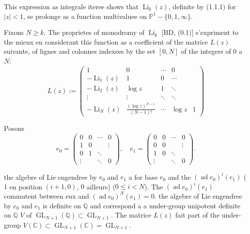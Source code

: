 \documentclass[12pt,a4paper]{article}
\theoremstyle{plain}
\theoremstyle{definition}
\theoremstyle{remark}
\DeclareMathOperator{\ad}{ad}
\newcommand{\Q}{\mathbb{Q}}
\newcommand{\C}{\mathbb{C}}
\newcommand{\IP}{\mathbb{P}}
\begin{document}
This expression as int{e}grale it{e}r{e}e shows that $\operatorname{Li}_k(z)$, d{e}finite by (1.1.1) for $|z|<1$, se prolonge as a function multivalu{e}e on $\IP^1-\{0,1,\infty\}$.

Fixons $N\geq k$. The propri{e}t{e}s of monodromy of $\operatorname{Li}_k$ [BD, (0.1)] s'expriment to the mieux en consid{e}rant this function as a coefficient of the matrice $L(z)$ suivante, of lignes and colonnes index{e}es by the set $[0,N]$ of the integers of $0$ {a} $N$:
\begin{equation}\label{eq:1.1.3}
L(z) := \begin{pmatrix}
1 & 0 & \cdots & 0\\
-\operatorname{Li}_1(z) & 1 & 0 & \cdots\\
-\operatorname{Li}_2(z) & \log z & 1 & \ddots\\
\vdots & \vdots & \ddots & \ddots\\
-\operatorname{Li}_N(z) & \frac{(\log z)^{N-1}}{(N-1)!} & \cdots & \log z & 1
\end{pmatrix}
\tag{1.1.3}
\end{equation}

Posons
\begin{equation}\label{eq:1.1.4}
e_0 = \begin{pmatrix}
0 & 0 & \cdots & 0\\
1 & 0 & & \vdots\\
0 & 1 & \ddots & \\
\vdots & & \ddots & 0
\end{pmatrix}, \quad
e_1 = \begin{pmatrix}
0 & 0 & \cdots & 0\\
0 & 0 & & \vdots\\
1 & 0 & \ddots & \\
\vdots & & \ddots & 0
\end{pmatrix}.
\tag{1.1.4}
\end{equation}

the alg{e}bre of Lie engendr{e}e by $e_0$ and $e_1$ a for base $e_0$ and the $(\ad e_0)^i(e_1)$ ($1$ en position $(i+1,0)$, $0$ ailleurs) ($0\leq i<N$). The $(\ad e_0)^i(e_1)$ commutent between eux and $(\ad e_0)^N(e_1)=0$. the alg{e}bre of Lie engendr{e}e by $e_0$ and $e_1$ is d{e}finite on $\Q$ and correspond {a} a under-group unipotent d{e}finite on $\Q$ $V$ of $\operatorname{GL}_{N+1}(\Q)\subset\operatorname{GL}_{N+1}$. The matrice $L(z)$ fait part of the under-group $V(\C)\subset\operatorname{GL}_{N+1}(\C)=\operatorname{GL}_{N+1}$.
\end{document}
